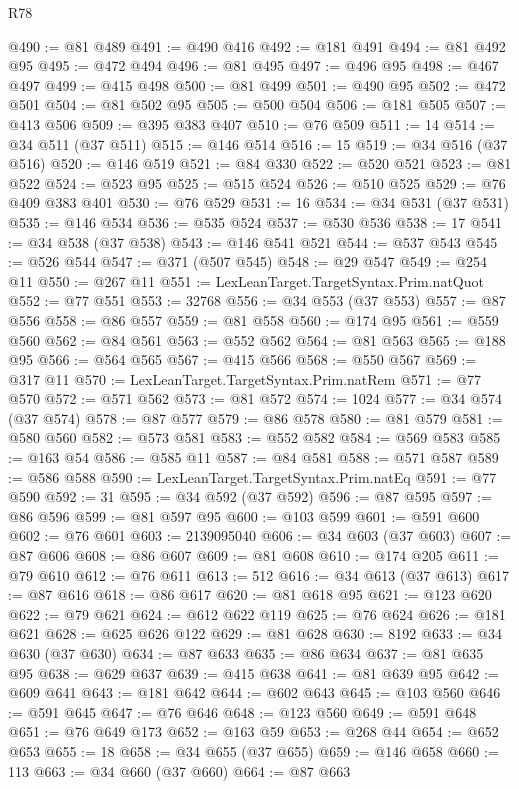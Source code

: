 \begin{lexlean}{R78}
\begin{coremodule}
@490 := @81 @489
@491 := @490 @416
@492 := @181 @491
@494 := @81 @492 @95
@495 := @472 @494
@496 := @81 @495
@497 := @496 @95
@498 := @467 @497
@499 := @415 @498
@500 := @81 @499
@501 := @490 @95
@502 := @472 @501
@504 := @81 @502 @95
@505 := @500 @504
@506 := @181 @505
@507 := @413 @506
@509 := @395 @383 @407
@510 := @76 @509
@511 := 14
@514 := @34 @511 (@37 @511)
@515 := @146 @514
@516 := 15
@519 := @34 @516 (@37 @516)
@520 := @146 @519
@521 := @84 @330
@522 := @520 @521
@523 := @81 @522
@524 := @523 @95
@525 := @515 @524
@526 := @510 @525
@529 := @76 @409 @383 @401
@530 := @76 @529
@531 := 16
@534 := @34 @531 (@37 @531)
@535 := @146 @534
@536 := @535 @524
@537 := @530 @536
@538 := 17
@541 := @34 @538 (@37 @538)
@543 := @146 @541 @521
@544 := @537 @543
@545 := @526 @544
@547 := @371 (@507 @545)
@548 := @29 @547
@549 := @254 @11
@550 := @267 @11
@551 := LexLeanTarget.TargetSyntax.Prim.natQuot
@552 := @77 @551
@553 := 32768
@556 := @34 @553 (@37 @553)
@557 := @87 @556
@558 := @86 @557
@559 := @81 @558
@560 := @174 @95
@561 := @559 @560
@562 := @84 @561
@563 := @552 @562
@564 := @81 @563
@565 := @188 @95
@566 := @564 @565
@567 := @415 @566
@568 := @550 @567
@569 := @317 @11
@570 := LexLeanTarget.TargetSyntax.Prim.natRem
@571 := @77 @570
@572 := @571 @562
@573 := @81 @572
@574 := 1024
@577 := @34 @574 (@37 @574)
@578 := @87 @577
@579 := @86 @578
@580 := @81 @579
@581 := @580 @560
@582 := @573 @581
@583 := @552 @582
@584 := @569 @583
@585 := @163 @54
@586 := @585 @11
@587 := @84 @581
@588 := @571 @587
@589 := @586 @588
@590 := LexLeanTarget.TargetSyntax.Prim.natEq
@591 := @77 @590
@592 := 31
@595 := @34 @592 (@37 @592)
@596 := @87 @595
@597 := @86 @596
@599 := @81 @597 @95
@600 := @103 @599
@601 := @591 @600
@602 := @76 @601
@603 := 2139095040
@606 := @34 @603 (@37 @603)
@607 := @87 @606
@608 := @86 @607
@609 := @81 @608
@610 := @174 @205
@611 := @79 @610
@612 := @76 @611
@613 := 512
@616 := @34 @613 (@37 @613)
@617 := @87 @616
@618 := @86 @617
@620 := @81 @618 @95
@621 := @123 @620
@622 := @79 @621
@624 := @612 @622 @119
@625 := @76 @624
@626 := @181 @621
@628 := @625 @626 @122
@629 := @81 @628
@630 := 8192
@633 := @34 @630 (@37 @630)
@634 := @87 @633
@635 := @86 @634
@637 := @81 @635 @95
@638 := @629 @637
@639 := @415 @638
@641 := @81 @639 @95
@642 := @609 @641
@643 := @181 @642
@644 := @602 @643
@645 := @103 @560
@646 := @591 @645
@647 := @76 @646
@648 := @123 @560
@649 := @591 @648
@651 := @76 @649 @173
@652 := @163 @59
@653 := @268 @44
@654 := @652 @653
@655 := 18
@658 := @34 @655 (@37 @655)
@659 := @146 @658
@660 := 113
@663 := @34 @660 (@37 @660)
@664 := @87 @663

\end{coremodule}
\end{lexlean}
